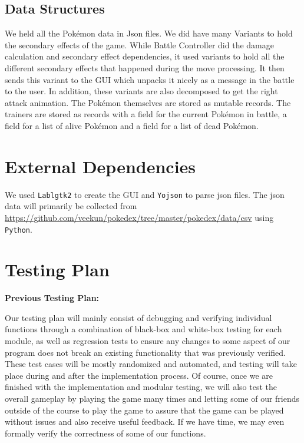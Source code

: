 \documentclass{scrreprt}
\begin{document}
\subsection{Data Structures}
We held all the Pok\'emon data in Json files. We did have many Variants to hold the secondary effects of the game. While Battle Controller did the damage calculation and secondary effect dependencies, it used variants to hold all the different secondary effects that happened during the move processing. It then sends this variant to the GUI which unpacks it nicely as a message in the battle to the user. In addition, these variants are also decomposed to get the right attack animation. The Pok\'emon themselves are stored as mutable records. The trainers are stored as records with a field for the current Pok\'emon in battle, a field for a list of alive Pok\'emon and a field for a list of dead Pok\'emon. 

\section{External Dependencies}
We used  \texttt{Lablgtk2} to create the GUI and \texttt{Yojson} to parse json files. The json data will primarily be collected from \url{https://github.com/veekun/pokedex/tree/master/pokedex/data/csv} using \texttt{Python}. 

\section{Testing Plan}

\textbf{Previous Testing Plan:}

Our testing plan will mainly consist of debugging and verifying individual functions through a combination of black-box and white-box testing for each module, as well as regression tests to ensure any changes to some aspect of our program does not break an existing functionality that was previously verified. These test cases will be mostly randomized and automated, and testing will take place during and after the implementation process. Of course, once we are finished with the implementation and modular testing, we will also test the overall gameplay by playing the game many times and letting some of our friends outside of the course to play the game to assure that the game can be played without issues and also receive useful feedback. If we have time, we may even formally verify the correctness of some of our functions.
\end{document}
